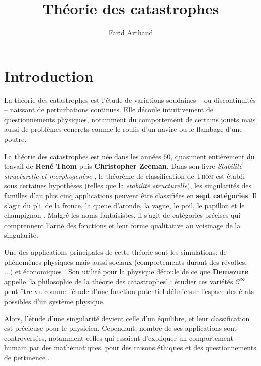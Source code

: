 \documentclass{article}
\newcommand{\cinf}{\mathcal{C}^\infty}
\theoremstyle{definition}
\theoremstyle{plain}
\begin{document}


\setcounter{page}{1}

\title{Théorie des catastrophes}
\author{Farid Arthaud}

\maketitle
\tableofcontents

\section{Introduction}

La théorie des catastrophes est l'étude de variations soudaines -- ou discontinuités -- naissant de perturbations continues.
Elle découle intuitivement de questionnements physiques, notamment du comportement de certains jouets \cite{bbcvid} mais aussi de problèmes concrets comme le roulis d'un navire \cite{poston} ou le flambage d'une poutre.

La théorie des catastrophes est née dans les années 60, quasiment entièrement du travail de \textbf{René Thom} puis \textbf{Christopher Zeeman}.
Dans son livre \textit{Stabilité structurelle et morphogenèse} \cite{thom}, le théorème de classification de \textsc{Thom} est établi: sous certaines hypothèses (telles que la \textit{stabilité structurelle}), les singularités des familles d'au plus cinq applications peuvent être classifiées en \textbf{sept catégories}.
Il s'agit du pli, de la fronce, la queue d'aronde, la vague, le poil, le papillon et le champignon \cite{wikipedia}.
Malgré les noms fantaisistes, il s'agit de catégories précises qui comprennent l'arité des fonctions et leur forme qualitative au voisinage de la singularité.

Une des applications principales de cette théorie sont les simulations: de phénomènes physiques mais aussi sociaux (comportements durant des révoltes, ...) et économiques \cite{bbcvid} \cite{poston}.
Son utilité pour la physique découle de ce que \textbf{Demazure} appelle `la philosophie de la théorie des catastrophes' \cite{demazure}: étudier ces variétés $\cinf$ peut être vu comme l'étude d'une fonction potentiel définie sur l'espace des états possibles d'un système physique.

Alors, l'étude d'une singularité devient celle d'un équilibre, et leur classification est précieuse pour le physicien.
Cependant, nombre de ses applications sont controversées, notamment celles qui essaient d'expliquer un comportement humain par des mathématiques, pour des raisons éthiques et des questionnements de pertinence \cite{wikipedia}.
\end{document}
